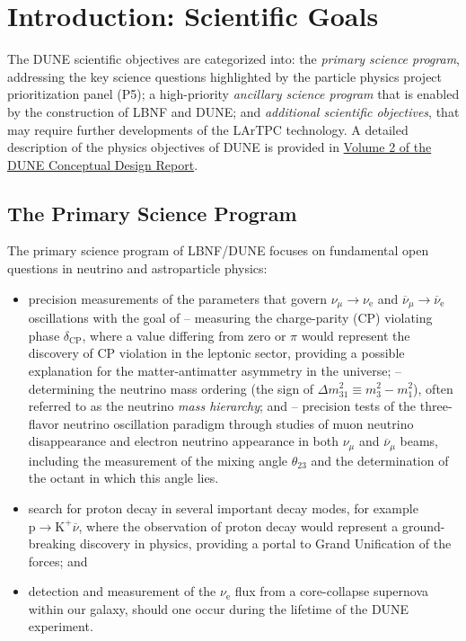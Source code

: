 \section{Introduction: Scientific Goals}
\label{sec:exec-summ-physics-goals}


The DUNE scientific objectives are categorized into: the \textit{primary science program}, addressing the key science questions 
highlighted by the particle physics project prioritization panel (P5); 
a high-priority \textit{ancillary science program} that is 
enabled by the construction of LBNF and DUNE; and \textit{additional scientific objectives}, that may require further developments 
of the LArTPC technology. A detailed description of the physics objectives of DUNE is provided in \href{http://arxiv.org/abs/1512.06148}{Volume 2 of the DUNE Conceptual Design Report}.

\subsection{The Primary Science Program}

The primary science program of LBNF/DUNE  focuses on fundamental open questions in neutrino and astroparticle physics: 
\begin{itemize}
  \item precision measurements of the parameters that govern $\nu_{\mu} \rightarrow \nu_\text{e}$ and
           $\overline{\nu}_{\mu} \rightarrow \overline{\nu}_\text{e}$ oscillations with the goal of
  \subitem -- measuring the charge-parity (CP) violating phase $\delta_\text{CP}$, where a value differing from zero or $\pi$ would represent the discovery of CP violation in the leptonic sector, providing a possible explanation for the matter-antimatter asymmetry in the universe;
  \subitem -- determining the neutrino mass ordering (the sign of $\Delta m^2_{31} \equiv m_3^2-m_1^2$), often referred to as the neutrino \textit{mass hierarchy}; and
  \subitem -- precision tests of the three-flavor neutrino oscillation paradigm through studies of muon neutrino disappearance 
    and electron neutrino appearance in both $\nu_\mu$ and $\overline{\nu}_{\mu}$ beams, including the 
    measurement of the mixing angle $\theta_{23}$ and the determination of the octant in which this angle lies.
    \item search for proton decay in several important decay modes, for example $\text{p}\rightarrow\text{K}^+\overline{\nu}$, where the observation of proton decay would represent a ground-breaking discovery in physics, providing a portal to Grand Unification of the forces; and
    \item detection and measurement of the $\nu_\text{e}$ flux from a core-collapse supernova within our galaxy, should one occur during the lifetime of the DUNE experiment.
\end{itemize}

